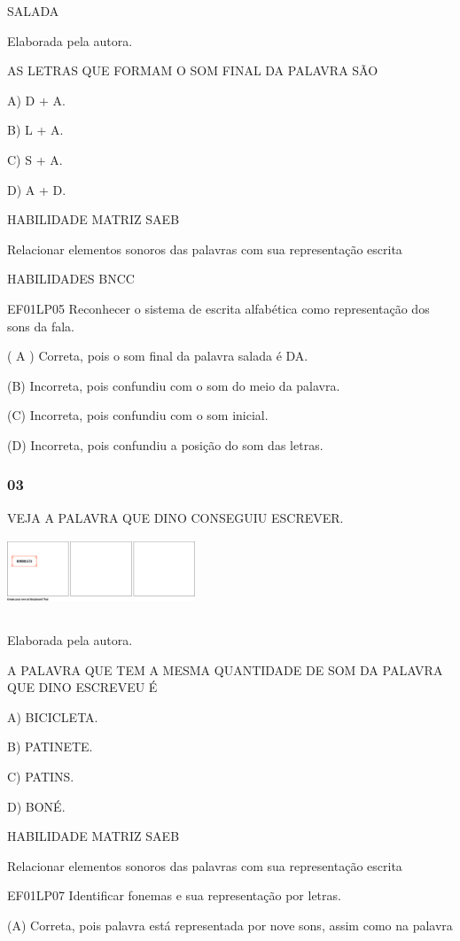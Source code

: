 \begin{escola}
SALADA

Elaborada pela autora.

AS LETRAS QUE FORMAM O SOM FINAL DA PALAVRA SÃO

A) D + A.

B) L + A.

C) S + A.

D) A + D.

HABILIDADE MATRIZ SAEB

Relacionar elementos sonoros das palavras com sua representação escrita

HABILIDADES BNCC

EF01LP05 Reconhecer o sistema de escrita alfabética como representação
dos sons da fala.

( A ) Correta, pois o som final da palavra salada é DA.

(B) Incorreta, pois confundiu com o som do meio da palavra.

(C) Incorreta, pois confundiu com o som inicial.

(D) Incorreta, pois confundiu a posição do som das
letras.\protect\hypertarget{_heading=h.ebpkik53igmj}{}{}

\subsubsection{03}\label{section-75}

VEJA A PALAVRA QUE DINO CONSEGUIU
ESCREVER.\includegraphics[width=2.21250in,height=1.04375in]{media/image243.png}

Elaborada pela autora.

A PALAVRA QUE TEM A MESMA QUANTIDADE DE SOM DA PALAVRA QUE DINO ESCREVEU
É

A) BICICLETA.

B) PATINETE.

C) PATINS.

D) BONÉ.

HABILIDADE MATRIZ SAEB

Relacionar elementos sonoros das palavras com sua representação escrita

EF01LP07 Identificar fonemas e sua representação por letras.

(A) Correta, pois palavra está representada por nove sons, assim como na
palavra


\end{escola}
